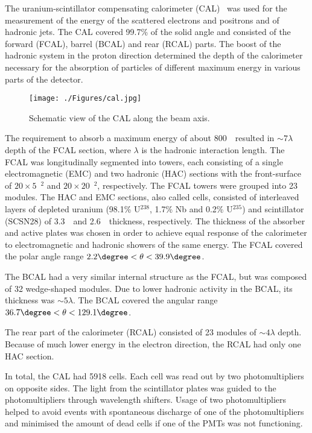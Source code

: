 The uranium-scintillator compensating calorimeter (CAL)~\cite{thesis:kruger:1992,nim:a309:77,nim:a309:101,nim:a321:356,nim:a336:23} was used for the measurement of the energy of the scattered electrons and positrons and of hadronic jets. The CAL covered 99.7\% of the solid angle and consisted of the forward (FCAL), barrel (BCAL) and rear (RCAL) parts. The boost of the hadronic system in the proton direction determined the depth of the calorimeter necessary for the absorption of particles of different maximum energy in various parts of the detector.
\begin{figure}[h]
	\centering
		\texttt{[image: ./Figures/cal.jpg]}
	\caption{Schematic view of the CAL along the beam axis.}
	\label{fig:cal}
\end{figure}

The requirement to absorb a maximum energy of about 800~\GeV\, resulted in $\sim 7 \lambda$ depth of the FCAL section, where $\lambda$ is the hadronic interaction length. The FCAL was longitudinally segmented into towers, each consisting of a single electromagnetic (EMC) and two hadronic (HAC) sections with the front-surface of $20 \times 5$~\cm$^{2}$ and $20 \times 20$~\cm$^{2}$, respectively. The FCAL towers were grouped into 23 modules. The HAC and EMC sections, also called cells, consisted of interleaved layers of depleted uranium (98.1\% U$^{238}$, 1.7\% Nb and 0.2\% U$^{235}$) and scintillator (SCSN28) of 3.3~\mm\, and 2.6~\mm\, thickness, respectively. The thickness of the absorber and active plates was chosen in order to achieve equal response of the calorimeter to electromagnetic and hadronic showers of the same energy. The FCAL covered the polar angle range $2.2\degree < \theta < 39.9\degree$.

The BCAL had a very similar internal structure as the FCAL, but was composed of 32 wedge-shaped modules. Due to lower hadronic activity in the BCAL, its thickness was $\sim 5 \lambda$. The BCAL covered the angular range $36.7\degree< \theta <129.1\degree$.

The rear part of the calorimeter (RCAL) consisted of 23 modules of $\sim 4 \lambda$ depth. Because of much lower energy in the electron direction, the RCAL had only one HAC section.

In total, the CAL had 5918 cells. Each cell was read out by two photomultipliers on opposite sides. The light from the scintillator plates was guided to the photomultipliers through wavelength shifters. Usage of two photomultipliers helped to avoid events with spontaneous discharge of one of the photomultipliers and minimised the amount of dead cells if one of the PMTs was not functioning.

